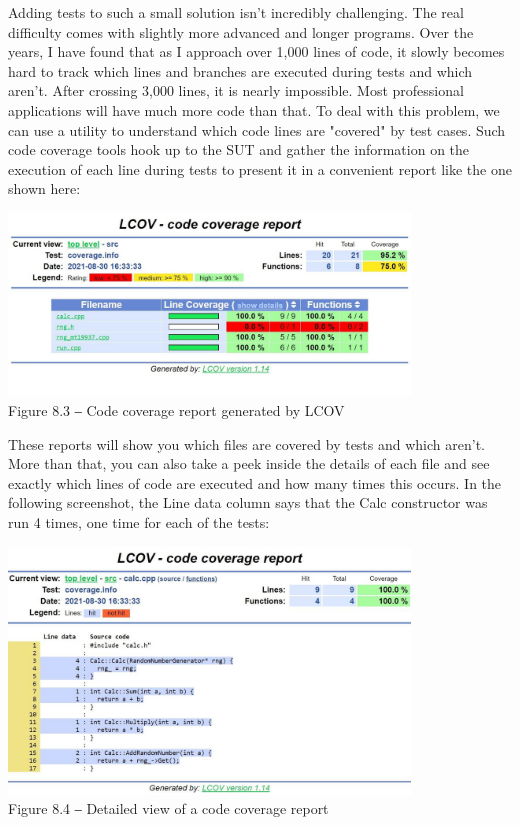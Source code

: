 

Adding tests to such a small solution isn't incredibly challenging. The real difficulty comes with slightly more advanced and longer programs. Over the years, I have found that as I approach over 1,000 lines of code, it slowly becomes hard to track which lines and branches are executed during tests and which aren't. After crossing 3,000 lines, it is nearly impossible. Most professional applications will have much more code than that. To deal with this problem, we can use a utility to understand which code lines are "covered" by test cases. Such code coverage tools hook up to the SUT and gather the information on the execution of each line during tests to present it in a convenient report like the one shown here:

\begin{center}
\includegraphics[width=0.8\textwidth]{content/3/chapter8/images/3.jpg}\\
Figure 8.3 ‒ Code coverage report generated by LCOV
\end{center}

These reports will show you which files are covered by tests and which aren't. More than that, you can also take a peek inside the details of each file and see exactly which lines of code are executed and how many times this occurs. In the following screenshot, the Line data column says that the Calc constructor was run 4 times, one time for each of the tests:

\begin{center}
\includegraphics[width=0.8\textwidth]{content/3/chapter8/images/4.jpg}\\
Figure 8.4 ‒ Detailed view of a code coverage report
\end{center}

